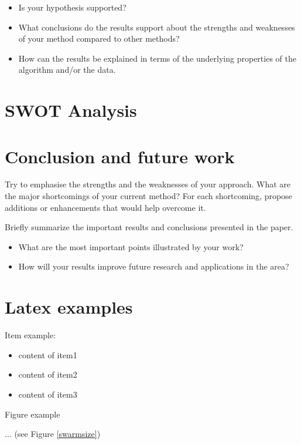 \documentclass[runningheads,a4paper,11pt]{report}
\begin{document}
\begin{itemize}
	\item Is your hypothesis supported? 
	\item What conclusions do the results support about the strengths and weaknesses of your method compared to other methods? 
	\item How can the results be explained in terms of the underlying properties of the algorithm and/or the data. 
\end{itemize}


\chapter{SWOT Analysis}
\label{chapter:swot}


\chapter{Conclusion and future work}
\label{chapter:concl}

Try to emphasise the strengths and the weaknesses of your approach.
What are the major shortcomings of your current method? For each shortcoming, propose additions or enhancements that would help overcome it. 

Briefly summarize the important results and conclusions presented in the paper. 

\begin{itemize}
	\item What are the most important points illustrated by your work? 
	\item How will your results improve future research and applications in the area? 
\end{itemize}


\chapter{Latex examples}

Item example: 

\begin{itemize}
	\item content of item1
 	\item content of item2
 	\item content of item3
\end{itemize}



Figure example 

$\ldots$ (see Figure \ref{swarmsize})
\end{document}
